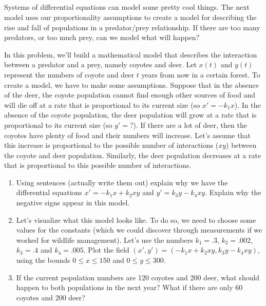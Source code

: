\subsection*{\ideaA}
Systems of differential equations can model some pretty cool things.  The next model uses our proportionality assumptions to create a model for describing the rise and fall of populations in a predator/prey relationship.  If there are too many predators, or too much prey, can we model what will happen?
\begin{problem}\label{predator prey model}
 In this problem, we'll build a mathematical model that describes the interaction between a predator and a prey, namely coyotes and deer. 
% 
Let $x(t)$ and $y(t)$ represent the numbers of coyote and deer $t$ years from now in a certain forest. To create a model, we have to make some assumptions.  
Suppose that in the absence of the deer, the coyote population cannot find enough other sources of food and will die off at a rate that is proportional to its current size (so $x'=-k_1 x$).  In the absence of the coyote population, the deer population will grow at a rate that is proportional to its current size (so $y' = ?$). If there are a lot of deer, then the coyotes have plenty of food and their numbers will increase. Let's assume that this increase is proportional to the possible number of interactions ($xy$) between the coyote and deer population.  Similarly, the deer population decreases at a rate that is proportional to this possible number of interactions.  
\begin{enumerate}
 \item Using sentences (actually write them out) explain why we have the differential equations $x' = -k_1 x+k_2xy$ and $y'=k_3 y-k_4 xy$.  Explain why the negative signs appear in this model.
 \item Let's visualize what this model looks like. To do so, we need to choose some values for the constants (which we could discover through measurements if we worked for wildlife management). Let's use the numbers $k_1=.3$, $k_2=.002$, $k_3=.4$ and $k_4 = .005$. Plot the field $(x',y') = (-k_1 x+k_2xy,k_3 y-k_4 xy)$, using the bounds $0\leq x\leq 150$ and $0\leq y\leq 300$.
 \item If the current population numbers are 120 coyotes and 200 deer, what should happen to both populations in the next year? What if there are only 60 coyotes and 200 deer?
\end{enumerate}

\end{problem}

